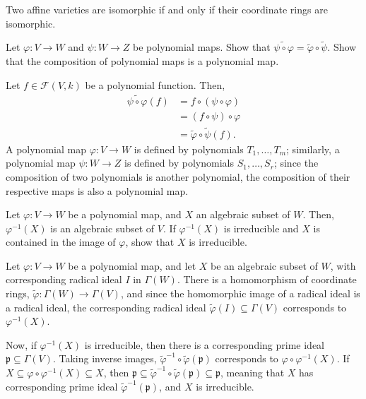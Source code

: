 \documentclass[10pt]{mypackage}
\begin{document}
Two affine varieties are isomorphic if and only if their coordinate rings are isomorphic.
\begin{exercise}[Exercise 2.6]
Let $\varphi\colon V\rightarrow W$ and $\psi\colon W\rightarrow Z$ be polynomial maps. Show that $\widetilde{\psi\circ\varphi} = \widetilde{\varphi}\circ\widetilde{\psi}$. Show that the composition of polynomial maps is a polynomial map.
\end{exercise}
\begin{solution}
  Let $f\in \mathcal{F}\left( V,k \right)$ be a polynomial function. Then,
  \begin{align*}
    \widetilde{\psi\circ\varphi}\left( f \right) &= f\circ \left( \psi\circ\varphi \right)\\
                                                 &= \left( f\circ\psi \right)\circ\varphi\\
                                                 &= \widetilde{\varphi}\circ \widetilde{\psi}\left( f \right).
  \end{align*}
  A polynomial map $\varphi\colon V\rightarrow W$ is defined by polynomials $T_1,\dots,T_m$; similarly, a polynomial map $\psi\colon W\rightarrow Z$ is defined by polynomials $S_1,\dots,S_r$; since the composition of two polynomials is another polynomial, the composition of their respective maps is also a polynomial map.
\end{solution}
\begin{exercise}[Exercise 2.7]
  Let $\varphi\colon V\rightarrow W$ be a polynomial map, and $X$ an algebraic subset of $W$. Then, $\varphi^{-1}\left( X \right)$ is an algebraic subset of $V$. If $\varphi^{-1}\left( X \right)$ is irreducible and $X$ is contained in the image of $\varphi$, show that $X$ is irreducible.
\end{exercise}
\begin{solution}
  Let $\varphi\colon V\rightarrow W$ be a polynomial map, and let $X$ be an algebraic subset of $W$, with corresponding radical ideal $I$ in $\Gamma(W)$. There is a homomorphism of coordinate rings, $\widetilde{\varphi}\colon \Gamma(W)\rightarrow \Gamma(V)$, and since the homomorphic image of a radical ideal is a radical ideal, the corresponding radical ideal $\widetilde{\varphi}\left( I \right)\subseteq \Gamma(V)$ corresponds to $\varphi^{-1}\left( X \right)$.\newline

  Now, if $\varphi^{-1}\left( X \right)$ is irreducible, then there is a corresponding prime ideal $\mathfrak{p}\subseteq \Gamma(V)$. Taking inverse images, $\widetilde{\varphi}^{-1}\circ \widetilde{\varphi}\left( \mathfrak{p} \right)$ corresponds to $\varphi\circ\varphi^{-1}\left( X \right)$. If $X\subseteq \varphi\circ\varphi^{-1}\left( X \right)\subseteq X$, then $\mathfrak{p}\subseteq \widetilde{\varphi}^{-1}\circ\widetilde{\varphi}\left( \mathfrak{p} \right)\subseteq \mathfrak{p}$, meaning that $X$ has corresponding prime ideal $\widetilde{\varphi}^{-1}\left( \mathfrak{p} \right)$, and $X$ is irreducible.
\end{solution}
\end{document}

